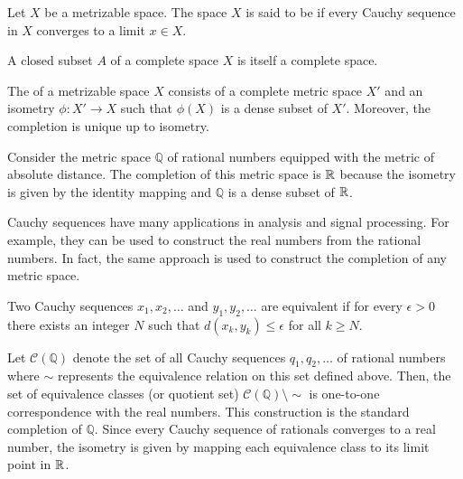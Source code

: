 \begin{definition}
Let $X$ be a metrizable space.
The space $X$ is said to be  if every Cauchy sequence in $X$ converges to a limit $x \in X$.
\end{definition}

\begin{theorem}
A closed subset $A$ of a complete space $X$ is itself a complete space.
\end{theorem}

\begin{definition}
The  of a metrizable space $X$ consists of a complete metric space $X'$ and an isometry $\phi : X' \rightarrow X$ such that $\phi(X)$ is a dense subset of $X'$.
Moreover, the completion is unique up to isometry.
\end{definition}

\begin{example}
Consider the metric space $\mathbb{Q}$ of rational numbers equipped with the metric of absolute distance.
The completion of this metric space is $\mathbb{R}$ because the isometry is given by the identity mapping and $\mathbb{Q}$ is a dense subset of $\mathbb{R}$.
\end{example}

Cauchy sequences have many applications in analysis and signal processing.
For example, they can be used to construct the real numbers from the rational numbers.
In fact, the same approach is used to construct the completion of any metric space.

\begin{definition}
Two Cauchy sequences $x_1, x_2, \ldots$ and $y_1, y_2, \ldots$ are equivalent if for every $\epsilon >0$ there exists an integer $N$ such that $d (x_k, y_k) \leq \epsilon$ for all $k \geq N$.
\end{definition}

\begin{example}
Let $\mathcal{C}(\mathbb{Q})$ denote the set of all Cauchy sequences $q_1, q_2, \ldots$ of rational numbers where $\sim$ represents the equivalence relation on this set defined above.
Then, the set of equivalence classes (or quotient set) $\mathcal{C}(\mathbb{Q}) \setminus \!\! \sim$ is one-to-one correspondence with the real numbers.
This construction is the standard completion of $\mathbb{Q}$.
Since every Cauchy sequence of rationals converges to a real number, the isometry is given by mapping each equivalence class to its limit point in $\mathbb{R}$.
\end{example}

